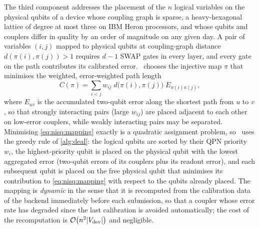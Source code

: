 The third component addresses the placement of the $n$ logical variables on the physical qubits of a device whose coupling graph is sparse, a heavy-hexagonal lattice of degree at most three on IBM Heron processors, and whose qubits and couplers differ in quality by an order of magnitude on any given day. A pair of variables $(i,j)$ mapped to physical qubits at coupling-graph distance $d(\pi(i),\pi(j))>1$ requires $d-1$ SWAP gates in every layer, and every gate on the path contributes its calibrated error. \deal\ chooses the injective map $\pi$ that minimises the weighted, error-weighted path length
\begin{equation}\label{eq:nisq:mapping}
  C(\pi) = \sum_{i<j} w_{ij}\; d\bigl(\pi(i),\pi(j)\bigr)\; E_{\pi(i)\pi(j)},
\end{equation}
where $E_{uv}$ is the accumulated two-qubit error along the shortest path from $u$ to $v$, so that strongly interacting pairs (large $w_{ij}$) are placed adjacent to each other on low-error couplers, while weakly interacting pairs may be separated. Minimising \cref{eq:nisq:mapping} exactly is a quadratic assignment problem, so \deal\ uses the greedy rule of \cref{alg:deal}: the logical qubits are sorted by their QPN priority $w_{i}$, the highest-priority qubit is placed on the physical qubit with the lowest aggregated error (two-qubit errors of its couplers plus its readout error), and each subsequent qubit is placed on the free physical qubit that minimises its contribution to \cref{eq:nisq:mapping} with respect to the qubits already placed. The mapping is \emph{dynamic} in the sense that it is recomputed from the calibration data of the backend immediately before each submission, so that a coupler whose error rate has degraded since the last calibration is avoided automatically; the cost of the recomputation is $\mathcal{O}\!\left(n^{2}\lvert V_{\mathrm{dev}}\rvert\right)$ and negligible.

